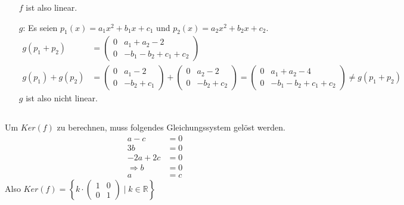 \documentclass{../mfa}
\begin{document}
\begin{itemize}
$f$ ist also linear.
\item[$g$:] Es seien $p_1(x) = a_1x^2 + b_1x + c_1$ und $p_2(x) = a_2x^2 + b_2x
   + c_2$.
   \begin{align*}
      g(p_1 + p_2) &= \begin{pmatrix}
      0 & a_1 + a_2 - 2 \\
      0 & -b_1 -b_2 + c_1 + c_2
   \end{pmatrix} \\
   g(p_1) + g(p_2) &= \begin{pmatrix}
   0 & a_1 - 2 \\
   0 & -b_2 + c_1
\end{pmatrix} + \begin{pmatrix}
   0 & a_2 - 2 \\
   0 & -b_2 + c_2
\end{pmatrix} = \begin{pmatrix}
   0 & a_1 + a_2 - 4 \\
   0 & -b_1 -b_2 + c_1 + c_2
\end{pmatrix} \neq g(p_1 + p_2)
   \end{align*}
   $g$ ist also nicht linear.
\end{itemize}

\subsection{}
Um $Ker(f)$ zu berechnen, muss folgendes Gleichungssystem gelöst werden.
\begin{align*}
   a - c    & = 0 \\
   3b       & = 0 \\
   -2a + 2c & = 0 \\
   \Rightarrow b &= 0 \\
   a &= c
\end{align*}
Also $Ker(f) = \left\{k \cdot \begin{pmatrix} 1 & 0 \\ 0 & 1 \end{pmatrix} \mid k \in \mathbb{R} \right\}$

\subsection{}
\end{document}
